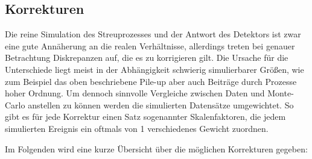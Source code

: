 \subsection{Korrekturen}
\label{mc_corrections}
Die reine Simulation des Streuprozesses und der Antwort des Detektors ist zwar
eine gute Annäherung an die realen Verhältnisse, allerdings treten bei genauer
Betrachtung Diskrepanzen auf, die es zu korrigieren gilt. Die Ursache für die
Unterschiede liegt meist in der Abhängigkeit schwierig simulierbarer Größen,
wie zum Beispiel das oben beschriebene Pile-up aber auch Beiträge durch 
Prozesse hoher Ordnung. Um dennoch sinnvolle Vergleiche zwischen Daten und
Monte-Carlo anstellen zu können werden die simulierten Datensätze umgewichtet.
So gibt es für jede Korrektur einen Satz sogenannter Skalenfaktoren, die jedem
simulierten Ereignis ein oftmals von 1 verschiedenes Gewicht zuordnen.

Im Folgenden wird eine kurze Übersicht über die möglichen Korrekturen gegeben:

